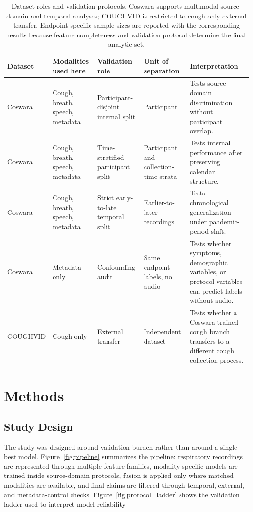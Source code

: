 \documentclass[journal]{IEEEtran}
\begin{document}
\begin{table}[t]
\caption{Dataset roles and validation protocols. Coswara supports multimodal source-domain and temporal analyses; COUGHVID is restricted to cough-only external transfer. Endpoint-specific sample sizes are reported with the corresponding results because feature completeness and validation protocol determine the final analytic set.}
\label{tab:dataset_protocols}
\centering
\scriptsize
\begin{tabularx}{\textwidth}{p{} p{} p{} p{} Y}
\toprule
Dataset & Modalities used here & Validation role & Unit of separation & Interpretation \\
\midrule
Coswara & Cough, breath, speech, metadata & Participant-disjoint internal split & Participant & Tests source-domain discrimination without participant overlap. \\
Coswara & Cough, breath, speech, metadata & Time-stratified participant split & Participant and collection-time strata & Tests internal performance after preserving calendar structure. \\
Coswara & Cough, breath, speech, metadata & Strict early-to-late temporal split & Earlier-to-later recordings & Tests chronological generalization under pandemic-period shift. \\
Coswara & Metadata only & Confounding audit & Same endpoint labels, no audio & Tests whether symptoms, demographic variables, or protocol variables can predict labels without audio. \\
COUGHVID & Cough only & External transfer & Independent dataset & Tests whether a Coswara-trained cough branch transfers to a different cough collection process. \\
\bottomrule
\end{tabularx}
\end{table}

\section{Methods}
\subsection{Study Design}
The study was designed around validation burden rather than around a single best model. Figure~\ref{fig:pipeline} summarizes the pipeline: respiratory recordings are represented through multiple feature families, modality-specific models are trained inside source-domain protocols, fusion is applied only where matched modalities are available, and final claims are filtered through temporal, external, and metadata-control checks. Figure~\ref{fig:protocol_ladder} shows the validation ladder used to interpret model reliability.
\end{document}
